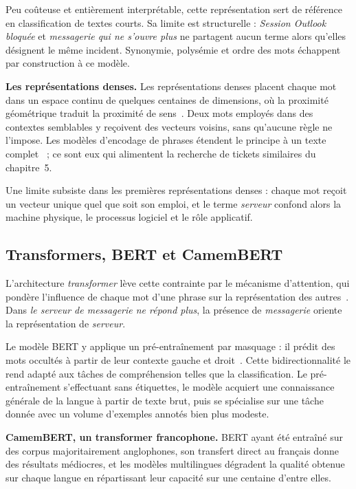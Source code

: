 Peu coûteuse et entièrement interprétable, cette représentation sert de référence en classification
de textes courts. Sa limite est structurelle : \emph{Session Outlook bloquée} et \emph{messagerie
qui ne s'ouvre plus} ne partagent aucun terme alors qu'elles désignent le même incident. Synonymie,
polysémie et ordre des mots échappent par construction à ce modèle.

\textbf{Les représentations denses.} Les représentations denses placent chaque mot dans un espace continu de quelques centaines de
dimensions, où la proximité géométrique traduit la proximité de sens~\cite{mikolov2013}. Deux mots
employés dans des contextes semblables y reçoivent des vecteurs voisins, sans qu'aucune règle ne
l'impose. Les modèles d'encodage de phrases étendent le principe à un texte
complet~\cite{reimers2019} ; ce sont eux qui alimentent la recherche de tickets similaires du
chapitre~5.

Une limite subsiste dans les premières représentations denses : chaque mot reçoit un vecteur unique
quel que soit son emploi, et le terme \emph{serveur} confond alors la machine physique, le processus
logiciel et le rôle applicatif.

\subsection{Transformers, BERT et CamemBERT}

L'architecture \emph{transformer} lève cette contrainte par le mécanisme d'attention, qui pondère
l'influence de chaque mot d'une phrase sur la représentation des autres~\cite{vaswani2017}. Dans
\emph{le serveur de messagerie ne répond plus}, la présence de \emph{messagerie} oriente la
représentation de \emph{serveur}.

Le modèle BERT y applique un pré-entraînement par masquage : il prédit des mots occultés à partir de
leur contexte gauche et droit~\cite{devlin2019}. Cette bidirectionnalité le rend adapté aux tâches
de compréhension telles que la classification. Le pré-entraînement s'effectuant sans étiquettes, le
modèle acquiert une connaissance générale de la langue à partir de texte brut, puis se spécialise
sur une tâche donnée avec un volume d'exemples annotés bien plus modeste.

\textbf{CamemBERT, un transformer francophone.} BERT ayant été entraîné sur des corpus majoritairement anglophones, son transfert direct au français
donne des résultats médiocres, et les modèles multilingues dégradent la qualité obtenue sur chaque
langue en répartissant leur capacité sur une centaine d'entre elles.

